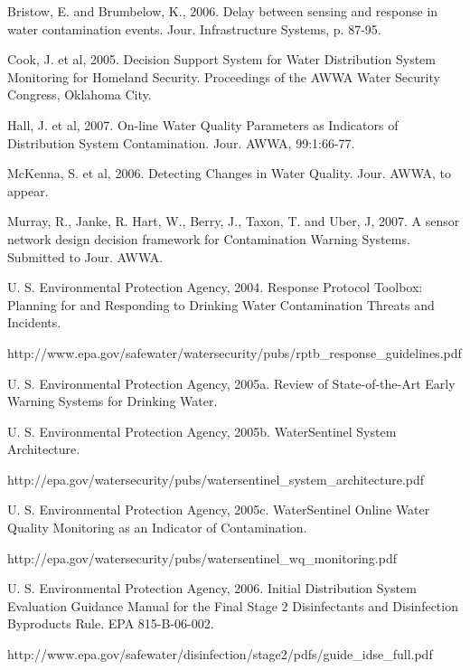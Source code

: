 Bristow, E. and Brumbelow, K., 2006. Delay between sensing and response in water contamination events. Jour. Infrastructure Systems, p. 87-95. 

Cook, J. et al, 2005. Decision Support System for Water Distribution System Monitoring for Homeland Security. Proceedings of the AWWA Water Security Congress, Oklahoma City. 

Hall, J. et al, 2007.  On-line Water Quality Parameters as Indicators of Distribution System Contamination.  Jour. AWWA, 99:1:66-77.

McKenna, S. et al, 2006. Detecting Changes in Water Quality. Jour. AWWA, to appear.

Murray, R., Janke, R. Hart, W., Berry, J., Taxon, T. and Uber, J, 2007.  A sensor network design decision framework for Contamination Warning Systems.  Submitted to Jour. AWWA.

U. S. Environmental Protection Agency, 2004. Response Protocol Toolbox: Planning for and Responding to Drinking Water Contamination Threats and Incidents. \begin{verb} http://www.epa.gov/safewater/watersecurity/pubs/rptb_response_guidelines.pdf \end{verb}

U. S. Environmental Protection Agency, 2005a. Review of State-of-the-Art Early Warning Systems for Drinking Water.

U. S. Environmental Protection Agency, 2005b. WaterSentinel System Architecture. \begin{verb} http://epa.gov/watersecurity/pubs/watersentinel_system_architecture.pdf \end{verb}

U. S. Environmental Protection Agency, 2005c. WaterSentinel Online Water Quality Monitoring as an Indicator of Contamination. \begin{verb} http://epa.gov/watersecurity/pubs/watersentinel_wq_monitoring.pdf \end{verb}

U. S. Environmental Protection Agency, 2006.  Initial Distribution System Evaluation Guidance Manual for the Final Stage 2 Disinfectants and Disinfection Byproducts Rule.   EPA 815-B-06-002.  \begin{verb} http://www.epa.gov/safewater/disinfection/stage2/pdfs/guide_idse_full.pdf \end{verb} 


